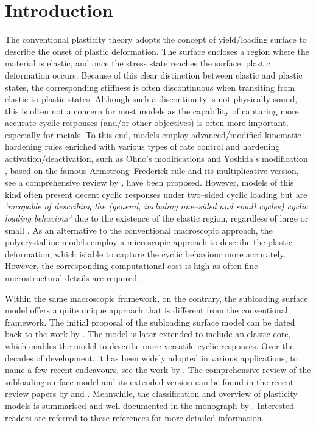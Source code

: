 \section{Introduction}
The conventional plasticity theory adopts the concept of yield/loading surface \citep[see, e.g.,][]{Lemaitre1990,Simo1998} to describe the onset of plastic deformation.
The surface encloses a region where the material is elastic, and once the stress state reaches the surface, plastic deformation occurs.
Because of this clear distinction between elastic and plastic states, the corresponding stiffness is often discontinuous when transiting from elastic to plastic states.
Although such a discontinuity is not physically sound, this is often not a concern for most models as the capability of capturing more accurate cyclic responses (and/or other objectives) is often more important, especially for metals.
To this end, models employ advanced/modified kinematic hardening rules enriched with various types of rate control and hardening activation/deactivation, such as Ohno's modifications \citep[see, e.g.,][]{Ohno1982,Ohno1993,Ohno2021} and Yoshida's modification \citep{Yoshida2002}, based on the famous Armstrong--Frederick rule \citep{Frederick2007} and its multiplicative version, see a comprehensive review by \citet{Chaboche2008}, have been proposed.
However, models of this kind often present decent cyclic responses under two--sided cyclic loading but are \emph{`incapable of describing the \textnormal{(general, including one--sided and small cycles)} cyclic loading behaviour'} \citep[][pg. 282]{Hashiguchi2023} due to the existence of the elastic region, regardless of large or small \citep{Dafalias1977}.
As an alternative to the conventional macroscopic approach, the polycrystalline models \citep[see, e.g.,][]{Beyerlein2018} employ a microscopic approach to describe the plastic deformation, which is able to capture the cyclic behaviour more accurately.
However, the corresponding computational cost is high as often fine microstructural details are required.

Within the same macroscopic framework, on the contrary, the subloading surface model offers a quite unique approach that is different from the conventional framework.
The initial proposal of the subloading surface model can be dated back to the work by \citet{Hashiguchi1980}.
The model is later extended \citep{Hashiguchi1989} to include an elastic core, which enables the model to describe more versatile cyclic responses.
Over the decades of development, it has been widely adopted in various applications, to name a few recent endeavours, see the work by \citet{Maranha2016,Xiong2018,Anjiki2021,Yamakawa2021,Yamakawa2022,Lu2023}.
The comprehensive review of the subloading surface model and its extended version can be found in the recent review papers by \citet{Hashiguchi2023a} and \citet{Hashiguchi2024}.
Meanwhile, the classification and overview of plasticity models is summarised and well documented in the monograph by \citet[see][\S~10.2]{Hashiguchi2023}.
Interested readers are referred to these references for more detailed information.

